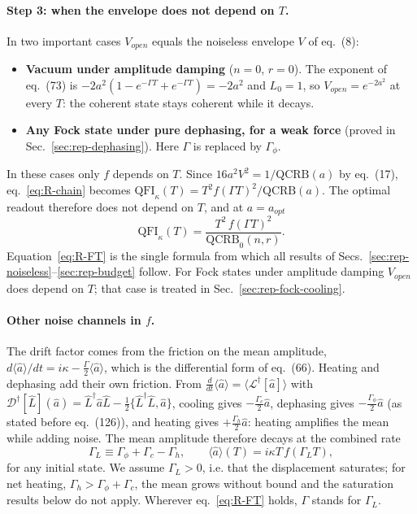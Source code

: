 \paragraph{Step 3: when the envelope does not depend on $T$.} In two important cases $V_{open}$ equals the noiseless envelope $V$ of eq.~(8):
\begin{itemize}
    \item \textbf{Vacuum under amplitude damping} ($n = 0$, $r = 0$). The exponent of eq.~(73) is $-2a^2(1 - e^{-\Gamma T} + e^{-\Gamma T}) = -2a^2$ and $L_0 = 1$, so $V_{open} = e^{-2a^2}$ at every $T$: the coherent state stays coherent while it decays.
    \item \textbf{Any Fock state under pure dephasing, for a weak force} (proved in Sec.~\ref{sec:rep-dephasing}). Here $\Gamma$ is replaced by $\Gamma_\phi$.
\end{itemize}
In these cases only $f$ depends on $T$. Since $16a^2V^2 = 1/\mathrm{QCRB}(a)$ by eq.~(17), eq.~\eqref{eq:R-chain} becomes $\mathrm{QFI}_\kappa(T) = T^2f(\Gamma T)^2/\mathrm{QCRB}(a)$. The optimal readout therefore does not depend on $T$, and at $a = a_{opt}$
\begin{equation}
\label{eq:R-FT}
    \mathrm{QFI}_\kappa(T) = \frac{T^2\,f(\Gamma T)^2}{\mathrm{QCRB}_0(n, r)} .
\end{equation}
Equation~\eqref{eq:R-FT} is the single formula from which all results of Secs.~\ref{sec:rep-noiseless}--\ref{sec:rep-budget} follow. For Fock states under amplitude damping $V_{open}$ does depend on $T$; that case is treated in Sec.~\ref{sec:rep-fock-cooling}.

\paragraph{Other noise channels in $f$.} The drift factor comes from the friction on the mean amplitude, $d\langle\hat{a}\rangle/dt = i\kappa - \tfrac{\Gamma}{2}\langle\hat{a}\rangle$, which is the differential form of eq.~(66). Heating and dephasing add their own friction. From $\tfrac{d}{dt}\langle\hat{a}\rangle = \langle\mathcal{L}^\dagger[\hat{a}]\rangle$ with $\mathcal{D}^\dagger[\hat{L}](\hat{a}) = \hat{L}^\dagger\hat{a}\hat{L} - \tfrac{1}{2}\{\hat{L}^\dagger\hat{L}, \hat{a}\}$, cooling gives $-\tfrac{\Gamma_c}{2}\hat{a}$, dephasing gives $-\tfrac{\Gamma_\phi}{2}\hat{a}$ (as stated before eq.~(126)), and heating gives $+\tfrac{\Gamma_h}{2}\hat{a}$: heating amplifies the mean while adding noise. The mean amplitude therefore decays at the combined rate
\begin{equation}
\label{eq:R-GammaL}
    \Gamma_L \equiv \Gamma_\phi + \Gamma_c - \Gamma_h,
    \qquad
    \langle\hat{a}\rangle(T) = i\kappa T\,f(\Gamma_L T),
\end{equation}
for any initial state. We assume $\Gamma_L > 0$, i.e. that the displacement saturates; for net heating, $\Gamma_h > \Gamma_\phi + \Gamma_c$, the mean grows without bound and the saturation results below do not apply. Wherever eq.~\eqref{eq:R-FT} holds, $\Gamma$ stands for $\Gamma_L$.

